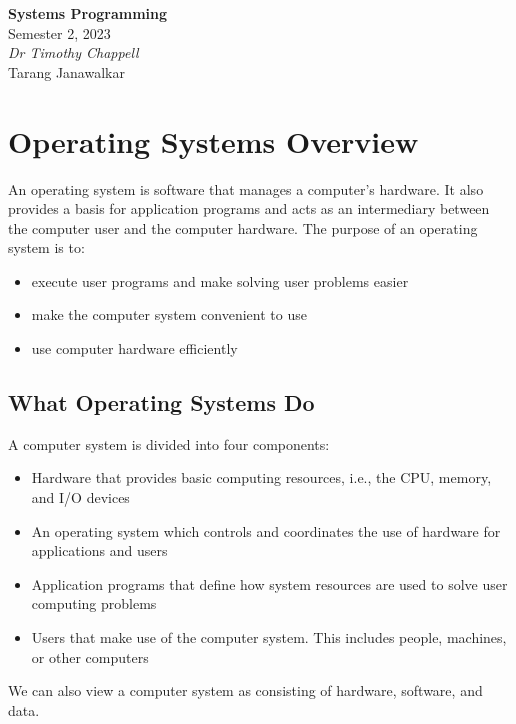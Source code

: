 \documentclass{article}
\date{}
\newcommand{\unitName}{Systems Programming}
\newcommand{\unitTime}{Semester 2, 2023}
\newcommand{\unitCoordinator}{Dr Timothy Chappell}
\newcommand{\documentAuthors}{Tarang Janawalkar}
\begin{document}
%
\begin{titlepage}
    \vspace*{\fill}
    \begin{center}
        \LARGE{\textbf{\unitName}} \\[0.1in]
        \normalsize{\unitTime} \\[0.2in]
        \normalsize\textit{\unitCoordinator} \\[0.2in]
        \documentAuthors
    \end{center}
    \vspace*{\fill}
    \doclicenseThis
    \thispagestyle{empty}
\end{titlepage}
\newpage
%
\tableofcontents
\newpage
%
\section{Operating Systems Overview}
An operating system is software that manages a computer's hardware. It
also provides a basis for application programs and acts as an
intermediary between the computer user and the computer hardware. The
purpose of an operating system is to:
\begin{itemize}
    \item execute user programs and make solving user problems easier
    \item make the computer system convenient to use
    \item use computer hardware efficiently
\end{itemize}
\subsection{What Operating Systems Do}
A computer system is divided into four components:
\begin{itemize}
    \item Hardware that provides basic computing resources, i.e., the
          CPU, memory, and I/O devices
    \item An operating system which controls and coordinates the use of
          hardware for applications and users
    \item Application programs that define how system resources are
          used to solve user computing problems
    \item Users that make use of the computer system. This includes
          people, machines, or other computers
\end{itemize}
We can also view a computer system as consisting of hardware, software,
and data.
\end{document}
